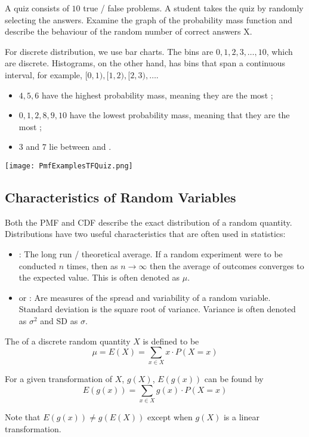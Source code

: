 \begin{example}
    A quiz consists of $10$ true / false problems. A student takes the quiz by randomly selecting the answers. Examine the graph of the probability mass function and describe the behaviour of the random number of correct answers X.

    For discrete distribution, we use bar charts. The bins are $0, 1, 2, 3, \dots, 10$, which are discrete. Histograms, on the other hand, has bins that span a continuous interval, for example, $[0, 1), [1, 2), [2, 3), \dots$. 

    \begin{itemize}
        \item $4, 5, 6$ have the highest probability mass, meaning they are the most ; 
        \item $0, 1, 2, 8, 9, 10$ have the lowest probability mass, meaning that they are the most ;
        \item $3$ and $7$ lie between  and .
    \end{itemize}

    \begin{center} \texttt{[image: PmfExamplesTFQuiz.png]} \end{center}
\end{example}

\subsection{Characteristics of Random Variables}

Both the PMF and CDF describe the exact distribution of a random quantity. Distributions have two useful characteristics that are often used in statistics:

\begin{itemize}
    \item {}: The long run / theoretical average. If a random experiment were to be conducted $n$ times, then as $n \to \infty$ then the average of outcomes converges to the expected value. This is often denoted as $\mu$.
    \item {} or : Are measures of the spread and variability of a random variable. Standard deviation is the square root of variance. Variance is often denoted as $\sigma^2$ and SD as $\sigma$.
\end{itemize}

\begin{definition}
    The  of a discrete random quantity $X$ is defined to be $$\mu = E(X) = \sum_{x \in X} x \cdot P(X = x)$$

    For a given transformation of $X$, $g(X)$, $E(g(x))$ can be found by $$E(g(x)) = \sum_{x \in X} g(x) \cdot P(X = x)$$

    Note that $E(g(x)) \neq g(E(X))$ except when $g(X)$ is a linear transformation. 
\end{definition}

